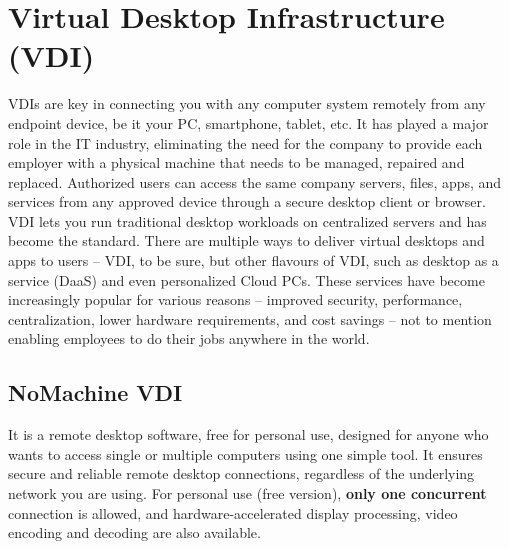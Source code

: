\documentclass[a4paper,12pt, final]{report}
\begin{document}


\chapter{Virtual Desktop Infrastructure (VDI)} %

VDIs are key in connecting you with any computer system remotely from any endpoint device, be it your PC, smartphone, tablet, etc. It has played a major role in the IT industry, eliminating the need for the company to provide each employer with a physical machine that needs to be managed, repaired and replaced. Authorized users can access the same company servers, files, apps, and services from any approved device through a secure desktop client or browser.\\

\noindent VDI lets you run traditional desktop workloads on centralized servers and has become the standard. There are multiple ways to deliver virtual desktops and apps to users -- VDI, to be sure, but other flavours of VDI, such as desktop as a service (DaaS) and even personalized Cloud PCs. These services have become increasingly popular for various reasons -- improved security, performance, centralization, lower hardware requirements, and cost savings -- not to mention enabling employees to do their jobs anywhere in the world.

\section{NoMachine VDI}
It is a remote desktop software, free for personal use, designed for anyone who wants to access single or multiple computers using one simple tool. It ensures secure and reliable remote desktop connections, regardless of the underlying network you are using. For personal use (free version), \textbf{only one concurrent} connection is allowed, and hardware-accelerated display processing, video encoding and decoding are also available. \cite{nomachine_intro}\\
\end{document}
